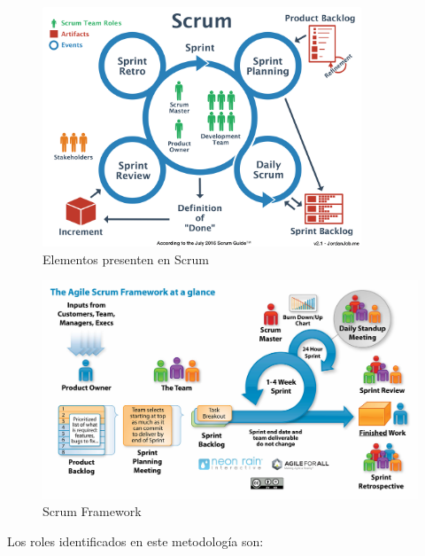 \begin{figure}[ht]
	\begin{center}
  \includegraphics[width=0.85\textwidth]{./figures/chapter_02/06_scrum.png}
  \caption{Elementos presenten en Scrum}
  \label{fig:scrum}
	\end{center}
\end{figure}

\begin{figure}[ht]
	\begin{center}
  \includegraphics[width=1\textwidth]{./figures/chapter_02/07_scrum_framework.jpg}
  \caption{Scrum Framework}
  \label{fig:scrum_framework}
	\end{center}
\end{figure}

Los roles identificados en este metodología son:

